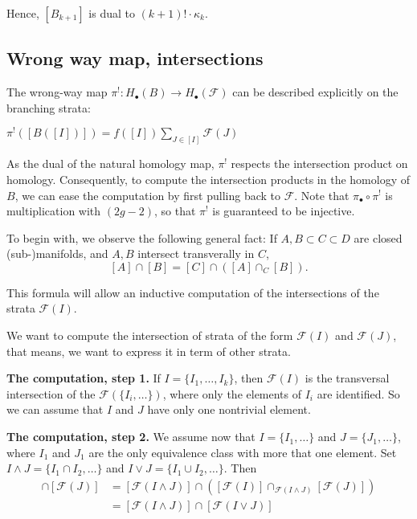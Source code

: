 Hence, $[B_{k+1}]$ is dual to $(k+1)! \cdot \kappa_k$.

\subsection{Wrong way map, intersections}

The wrong-way map $\pi^! : H_\bullet(B) \rightarrow H_\bullet(\mathcal{F})$ can be 
described explicitly on the branching strata:

\begin{prop}
$\pi^!([B([I])]) = f([I]) \sum_{J \in [I]} \mathcal{F}(J) $
\end{prop}

As the dual of the natural homology map, $\pi^!$ respects the intersection
product on homology. Consequently, to compute the intersection products
in the homology of $B$, we can ease the computation by first pulling back
to $\mathcal{F}$. Note that $\pi_\bullet \circ \pi^!$ is multiplication with
$(2g-2)$, so that $\pi^!$ is guaranteed to be injective.

To begin with, we observe the following general fact: If $A,B \subset C \subset D$
are closed (sub-)manifolds, and $A,B$ intersect transverally in $C$,
$$[A] \cap [B] = [C] \cap ( [A] \cap_C [B] ).$$

This formula will allow an inductive computation of the intersections of the
strata $\mathcal{F}(I)$.

We want to compute the intersection of strata of the form $\mathcal{F}(I)$
and $\mathcal{F}(J)$, that means, we want to express it in term of other strata.

\noindent \textbf{ The computation, step 1.}
If $I = \{I_1,\ldots,I_k\}$, then $\mathcal{F}(I)$ is the transversal
intersection of the $\mathcal{F}(\{I_i,\ldots\})$, where only the elements
of $I_i$ are identified. So we can assume that $I$ and $J$
have only one nontrivial element.

\noindent \textbf{ The computation, step 2.}
We assume now that $I=\{I_1,\ldots\}$ and $J=\{J_1,\ldots\}$, where
$I_1$ and $J_1$ are the only equivalence class with more that one element.
Set $I\wedge J = \{ I_1 \cap I_2 , \ldots \}$ and
$I \vee J  = \{ I_1 \cup I_2 , \ldots \}$.
Then
\begin{align}
  [\mathcal{F}(I)] \cap [\mathcal{F}(J)] 
    & = [\mathcal{F}(I \wedge J )] \cap 
       ( [\mathcal{F}(I)] \cap_{\mathcal{F}(I\wedge J)} [\mathcal{F}(J)] ) \\
    & = [\mathcal{F}(I \wedge J )] \cap [\mathcal{F}(I \vee J)] 
\end{align}

